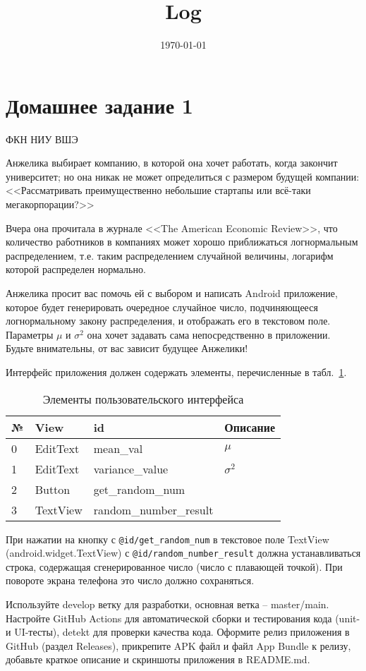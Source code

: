 \documentclass{article}
\title{Log}
\author{}
\date{\today}
\begin{document}
\section*{Домашнее задание 1}

ФКН НИУ ВШЭ \vspace{1.5em}

Анжелика выбирает компанию, в которой она хочет работать, когда закончит университет; но она никак не может определиться с размером будущей компании: <<Рассматривать преимущественно небольшие стартапы или всё-таки мегакорпорации?>>

Вчера она прочитала в журнале <<The American Economic Review>>, что количество работников в компаниях может хорошо приближаться логнормальным распределением, т.е. таким распределением случайной величины, логарифм которой распределен нормально.

Анжелика просит вас помочь ей с выбором и написать Android приложение, которое будет генерировать очередное случайное число, подчиняющееся логнормальному закону распределения, и отображать его в текстовом поле. Параметры $\mu$ и $\sigma ^2$ она хочет задавать сама непосредственно в приложении.
Будьте внимательны, от вас зависит будущее Анжелики!

Интерфейс приложения должен содержать элементы, перечисленные в табл.~\ref{table:layout:ids}.


\begin{table}[h]
\begin{center}
    \begin{tabularx}{0.78\textwidth}{p{3ex} p{13ex} X p{10ex}}
\midrule\toprule
№ & View       & id            &   Описание \\ \midrule
0 & EditText        & mean\_val   &   $\mu$ \\
1 & EditText        & variance\_value        &  $\sigma ^2$  \\
2 & Button            & get\_random\_num  & $	 $   \\
3 & TextView        & random\_number\_result         & $	 $    \\

\bottomrule\midrule
    \end{tabularx}
    \caption{Элементы пользовательского интерфейса}
    \label{table:layout:ids}
\end{center}
\end{table}


При нажатии на кнопку с \texttt{@id/get\_random\_num} в текстовое поле TextView  (android.widget.TextView) с \texttt{@id/random\_number\_result} должна устанавливаться строка, 
содержащая сгенерированное число (число с плавающей точкой).
При повороте экрана телефона это число должно сохраняться.


Используйте develop ветку для разработки, основная ветка -- master/main. Настройте GitHub Actions для автоматической сборки и тестирования кода (unit- и UI-тесты), detekt для проверки качества кода.
Оформите релиз приложения в GitHub (раздел Releases), прикрепите APK файл и файл App Bundle к релизу, добавьте краткое описание и скриншоты приложения в README.md.
\end{document}
